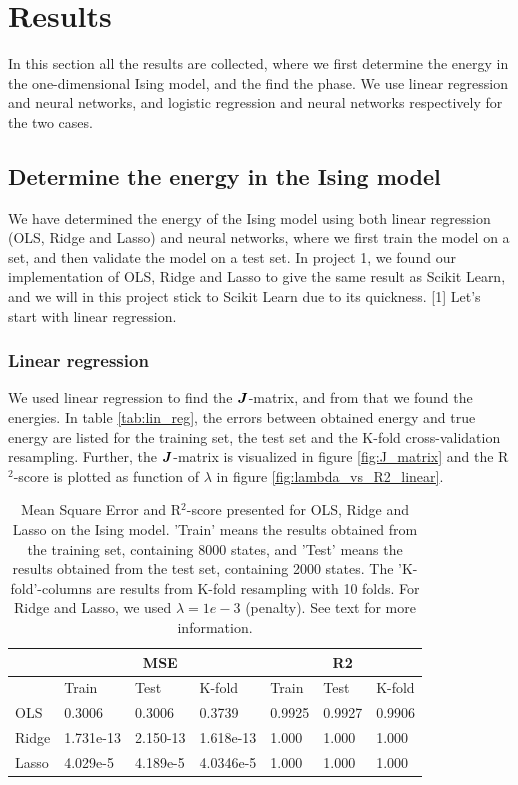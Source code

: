 \section{Results} \label{sec:results}
In this section all the results are collected, where we first determine the energy in the one-dimensional Ising model, and the find the phase. We use linear regression and neural networks, and logistic regression and neural networks respectively for the two cases.

\subsection{Determine the energy in the Ising model}
We have determined the energy of the Ising model using both linear regression (OLS, Ridge and Lasso) and neural networks, where we first train the model on a set, and then validate the model on a test set. In project 1, we found our implementation of OLS, Ridge and Lasso to give the same result as Scikit Learn, and we will in this project stick to Scikit Learn due to its quickness. [1] Let's start with linear regression. 

\subsubsection{Linear regression}
We used linear regression to find the $\boldsymbol{J}$-matrix, and from that we found the energies. In table \eqref{tab:lin_reg}, the errors between obtained energy and true energy are listed for the training set, the test set and the K-fold cross-validation resampling. Further, the $\boldsymbol{J}$-matrix is visualized in figure \eqref{fig:J_matrix} and the R$^2$-score is plotted as function of $\lambda$ in figure \eqref{fig:lambda_vs_R2_linear}.

\begin{table} [H]
	\caption{Mean Square Error and R$^2$-score presented for OLS, Ridge and Lasso on the Ising model. 'Train' means the results obtained from the training set, containing 8000 states, and 'Test' means the results obtained from the test set, containing 2000 states. The 'K-fold'-columns are results from K-fold resampling with 10 folds. For Ridge and Lasso, we used $\lambda=1e-3$ (penalty). See text for more information.}
	\begin{tabularx}{\textwidth}{l|XXX|XXX} \hline\hline
		\label{tab:lin_reg}
		& \multicolumn{3}{c}{\textbf{MSE}}&\multicolumn{3}{c}{\textbf{R2}}\\ \hline
		&Train&Test&K-fold&Train&Test&K-fold\\ \hline
		OLS & 0.3006 & 0.3006 & 0.3739 & 0.9925 & 0.9927 & 0.9906\\
		Ridge & 1.731e-13 & 2.150-13 & 1.618e-13 & 1.000 & 1.000 & 1.000 \\
		Lasso & 4.029e-5 & 4.189e-5 & 4.0346e-5 & 1.000 & 1.000 & 1.000 \\ \hline\hline
	\end{tabularx}
\end{table}

